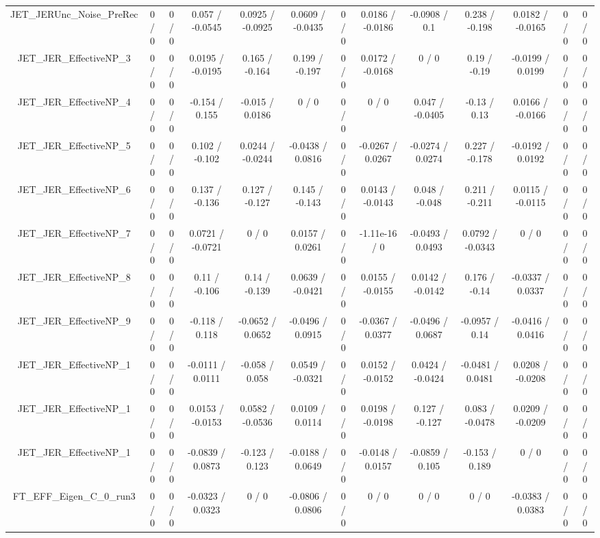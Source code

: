 \documentclass[10pt]{article}
\begin{document}
\begin{table}[htbp]
\begin{center}
\begin{tabular}{|c|c|c|c|c|c|c|c|c|c|c|c|c|}
  JET_JERUnc_Noise_PreRec & 0 / 0 & 0 / 0 & 0.057 / -0.0545 & 0.0925 / -0.0925 & 0.0609 / -0.0435 & 0 / 0 & 0.0186 / -0.0186 & -0.0908 / 0.1 & 0.238 / -0.198 & 0.0182 / -0.0165 & 0 / 0 & 0 / 0 \\ 
  JET_JER_EffectiveNP_3 & 0 / 0 & 0 / 0 & 0.0195 / -0.0195 & 0.165 / -0.164 & 0.199 / -0.197 & 0 / 0 & 0.0172 / -0.0168 & 0 / 0 & 0.19 / -0.19 & -0.0199 / 0.0199 & 0 / 0 & 0 / 0 \\ 
  JET_JER_EffectiveNP_4 & 0 / 0 & 0 / 0 & -0.154 / 0.155 & -0.015 / 0.0186 & 0 / 0 & 0 / 0 & 0 / 0 & 0.047 / -0.0405 & -0.13 / 0.13 & 0.0166 / -0.0166 & 0 / 0 & 0 / 0 \\ 
  JET_JER_EffectiveNP_5 & 0 / 0 & 0 / 0 & 0.102 / -0.102 & 0.0244 / -0.0244 & -0.0438 / 0.0816 & 0 / 0 & -0.0267 / 0.0267 & -0.0274 / 0.0274 & 0.227 / -0.178 & -0.0192 / 0.0192 & 0 / 0 & 0 / 0 \\ 
  JET_JER_EffectiveNP_6 & 0 / 0 & 0 / 0 & 0.137 / -0.136 & 0.127 / -0.127 & 0.145 / -0.143 & 0 / 0 & 0.0143 / -0.0143 & 0.048 / -0.048 & 0.211 / -0.211 & 0.0115 / -0.0115 & 0 / 0 & 0 / 0 \\ 
  JET_JER_EffectiveNP_7 & 0 / 0 & 0 / 0 & 0.0721 / -0.0721 & 0 / 0 & 0.0157 / 0.0261 & 0 / 0 & -1.11e-16 / 0 & -0.0493 / 0.0493 & 0.0792 / -0.0343 & 0 / 0 & 0 / 0 & 0 / 0 \\ 
  JET_JER_EffectiveNP_8 & 0 / 0 & 0 / 0 & 0.11 / -0.106 & 0.14 / -0.139 & 0.0639 / -0.0421 & 0 / 0 & 0.0155 / -0.0155 & 0.0142 / -0.0142 & 0.176 / -0.14 & -0.0337 / 0.0337 & 0 / 0 & 0 / 0 \\ 
  JET_JER_EffectiveNP_9 & 0 / 0 & 0 / 0 & -0.118 / 0.118 & -0.0652 / 0.0652 & -0.0496 / 0.0915 & 0 / 0 & -0.0367 / 0.0377 & -0.0496 / 0.0687 & -0.0957 / 0.14 & -0.0416 / 0.0416 & 0 / 0 & 0 / 0 \\ 
  JET_JER_EffectiveNP_1 & 0 / 0 & 0 / 0 & -0.0111 / 0.0111 & -0.058 / 0.058 & 0.0549 / -0.0321 & 0 / 0 & 0.0152 / -0.0152 & 0.0424 / -0.0424 & -0.0481 / 0.0481 & 0.0208 / -0.0208 & 0 / 0 & 0 / 0 \\ 
  JET_JER_EffectiveNP_1 & 0 / 0 & 0 / 0 & 0.0153 / -0.0153 & 0.0582 / -0.0536 & 0.0109 / 0.0114 & 0 / 0 & 0.0198 / -0.0198 & 0.127 / -0.127 & 0.083 / -0.0478 & 0.0209 / -0.0209 & 0 / 0 & 0 / 0 \\ 
  JET_JER_EffectiveNP_1 & 0 / 0 & 0 / 0 & -0.0839 / 0.0873 & -0.123 / 0.123 & -0.0188 / 0.0649 & 0 / 0 & -0.0148 / 0.0157 & -0.0859 / 0.105 & -0.153 / 0.189 & 0 / 0 & 0 / 0 & 0 / 0 \\ 
  FT_EFF_Eigen_C_0_run3 & 0 / 0 & 0 / 0 & -0.0323 / 0.0323 & 0 / 0 & -0.0806 / 0.0806 & 0 / 0 & 0 / 0 & 0 / 0 & 0 / 0 & -0.0383 / 0.0383 & 0 / 0 & 0 / 0 \\ 

\end{tabular}
\end{center}
\end{table}
\end{document}

